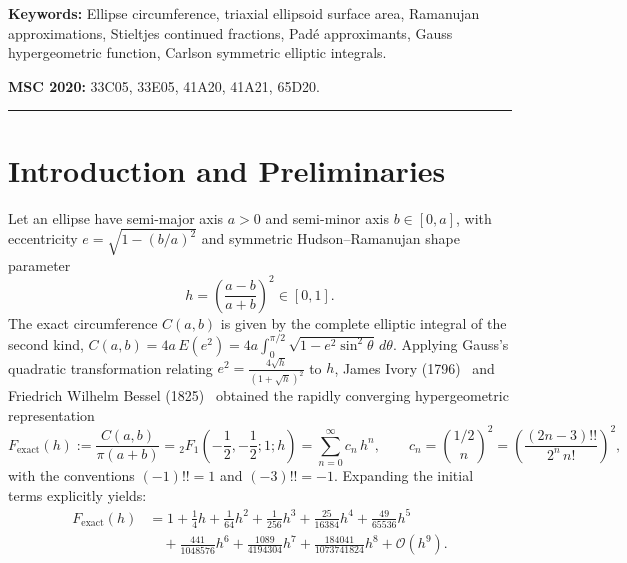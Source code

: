\documentclass[11pt,a4paper]{article}
\theoremstyle{spacious}
\theoremstyle{spaciousdef}
\begin{document}
\textbf{Keywords:} Ellipse circumference, triaxial ellipsoid surface area, Ramanujan approximations, Stieltjes continued fractions, Pad\'e approximants, Gauss hypergeometric function, Carlson symmetric elliptic integrals.

\textbf{MSC 2020:} 33C05, 33E05, 41A20, 41A21, 65D20.

\vspace{0.4cm}\hrule\vspace{0.4cm}

\section{Introduction and Preliminaries}

Let an ellipse have semi-major axis $a > 0$ and semi-minor axis $b \in [0, a]$, with eccentricity $e = \sqrt{1 - (b/a)^2}$ and symmetric Hudson--Ramanujan shape parameter
\begin{equation}\label{eq:h_def}
h = \left(\frac{a-b}{a+b}\right)^2 \in [0, 1].
\end{equation}
The exact circumference $C(a,b)$ is given by the complete elliptic integral of the second kind, $C(a,b) = 4a\,E(e^2) = 4a \int_0^{\pi/2}\sqrt{1 - e^2\sin^2\theta}\,d\theta$. Applying Gauss's quadratic transformation relating $e^2 = \tfrac{4\sqrt{h}}{(1+\sqrt{h})^2}$ to $h$, James Ivory (1796)~\cite{Ivory1796} and Friedrich Wilhelm Bessel (1825)~\cite{Bessel1825} obtained the rapidly converging hypergeometric representation
\begin{equation}\label{eq:ivory_bessel}
F_{\text{exact}}(h) := \frac{C(a,b)}{\pi(a+b)} = {}_2F_1\!\left(-\frac{1}{2}, -\frac{1}{2}; 1; h\right) = \sum_{n=0}^{\infty} c_n\,h^n, \qquad c_n = \binom{1/2}{n}^{\!2} = \left(\frac{(2n-3)!!}{2^n\,n!}\right)^{\!2},
\end{equation}
with the conventions $(-1)!! = 1$ and $(-3)!! = -1$. Expanding the initial terms explicitly yields:
\begin{equation}\label{eq:ivory_terms}
\begin{aligned}
F_{\text{exact}}(h) &= 1 + \frac{1}{4}h + \frac{1}{64}h^2 + \frac{1}{256}h^3 + \frac{25}{16384}h^4 + \frac{49}{65536}h^5 \\
&\quad + \frac{441}{1048576}h^6 + \frac{1089}{4194304}h^7 + \frac{184041}{1073741824}h^8 + \mathcal{O}(h^9).
\end{aligned}
\end{equation}
\end{document}
